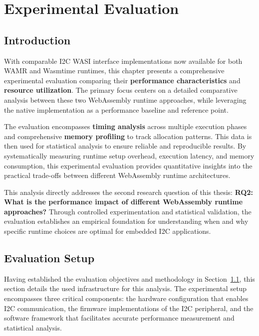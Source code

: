 \chapter{Experimental Evaluation}
\label{chap:eval}

\section{Introduction}
\label{sec:eval-intro}

With comparable I2C WASI interface implementations now available for both WAMR and Wasmtime runtimes, this chapter presents a comprehensive experimental evaluation comparing their \textbf{performance characteristics} and \textbf{resource utilization}. The primary focus centers on a detailed comparative analysis between these two WebAssembly runtime approaches, while leveraging the native implementation as a performance baseline and reference point.

The evaluation encompasses \textbf{timing analysis} across multiple execution phases and comprehensive \textbf{memory profiling} to track allocation patterns. This data is then used for statistical analysis to ensure reliable and reproducible results. By systematically measuring runtime setup overhead, execution latency, and memory consumption, this experimental evaluation provides quantitative insights into the practical trade-offs between different WebAssembly runtime architectures.

This analysis directly addresses the second research question of this thesis: \textbf{RQ2: What is the performance impact of different WebAssembly runtime approaches?} Through controlled experimentation and statistical validation, the evaluation establishes an empirical foundation for understanding when and why specific runtime choices are optimal for embedded I2C applications.

\section{Evaluation Setup}
\label{sec:eval-setup}

Having established the evaluation objectives and methodology in Section~\ref{sec:eval-intro}, this section details the used infrastructure for this analysis. The experimental setup encompasses three critical components: the hardware configuration that enables I2C communication, the firmware implementations of the I2C peripheral, and the software framework that facilitates accurate performance measurement and statistical analysis.


